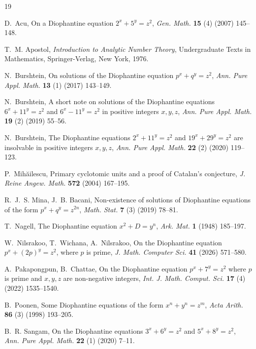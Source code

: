 \documentclass[preprint,12pt]{elsarticle}
\theoremstyle{definition}
\begin{document}
\begin{thebibliography}{19}\setlength{\itemsep}{2pt}

D.~Acu,
On a Diophantine equation $2^{x}+5^{y}=z^{2}$,
\emph{Gen. Math.} \textbf{15} (4) (2007) 145--148.

T.~M. Apostol,
\emph{Introduction to Analytic Number Theory},
Undergraduate Texts in Mathematics, Springer-Verlag, New York, 1976.

N.~Burshtein,
On solutions of the Diophantine equation $p^{x}+q^{y}=z^{2}$,
\emph{Ann. Pure Appl. Math.} \textbf{13} (1) (2017) 143--149.

N.~Burshtein,
A short note on solutions of the Diophantine equations $6^{x}+11^{y}=z^{2}$
and $6^{x}-11^{y}=z^{2}$ in positive integers $x,y,z$,
\emph{Ann. Pure Appl. Math.} \textbf{19} (2) (2019) 55--56.

N.~Burshtein,
The Diophantine equations $2^{x}+11^{y}=z^{2}$ and $19^{x}+29^{y}=z^{2}$ are
insolvable in positive integers $x,y,z$,
\emph{Ann. Pure Appl. Math.} \textbf{22} (2) (2020) 119--123.

P.~Mih\u{a}ilescu,
Primary cyclotomic units and a proof of Catalan's conjecture,
\emph{J. Reine Angew. Math.} \textbf{572} (2004) 167--195.

R.~J.~S. Mina, J.~B. Bacani,
Non-existence of solutions of Diophantine equations of the form
$p^{x}+q^{y}=z^{2n}$,
\emph{Math. Stat.} \textbf{7} (3) (2019) 78--81.

T.~Nagell,
The Diophantine equation $x^{2}+D=y^{n}$,
\emph{Ark. Mat.} \textbf{1} (1948) 185--197.

W.~Nilsrakoo, T.~Wichana, A.~Nilsrakoo,
On the Diophantine equation $p^{x}+(2p)^{y}=z^{2}$, where $p$ is prime,
\emph{J. Math. Computer Sci.} \textbf{41} (2026) 571--580.

A.~Pakapongpun, B.~Chattae,
On the Diophantine equation $p^{x}+7^{y}=z^{2}$ where $p$ is prime and
$x,y,z$ are non-negative integers,
\emph{Int. J. Math. Comput. Sci.} \textbf{17} (4) (2022) 1535--1540.

B.~Poonen,
Some Diophantine equations of the form $x^{n}+y^{n}=z^{m}$,
\emph{Acta Arith.} \textbf{86} (3) (1998) 193--205.

B.~R. Sangam,
On the Diophantine equations $3^{x}+6^{y}=z^{2}$ and $5^{x}+8^{y}=z^{2}$,
\emph{Ann. Pure Appl. Math.} \textbf{22} (1) (2020) 7--11.


\end{thebibliography}
\end{document}
